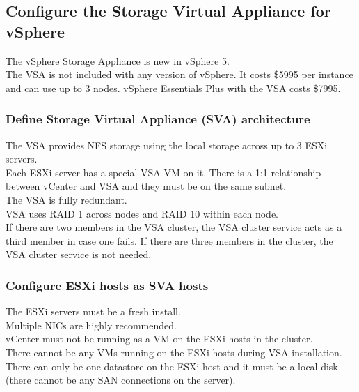 \subsection{Configure the Storage Virtual Appliance for vSphere}

The vSphere Storage Appliance is new in vSphere 5.\\

The VSA is not included with any version of vSphere. It costs \$5995 per
instance and can use up to 3 nodes. vSphere Essentials Plus with the VSA
costs \$7995.

\subsubsection{Define Storage Virtual Appliance (SVA) architecture}

The VSA provides NFS storage using the local storage across up to 3 ESXi
servers.\\

Each ESXi server has a special VSA VM on it. There is a 1:1 relationship
between vCenter and VSA and they must be on the same subnet.\\

The VSA is fully redundant.\\

VSA uses RAID 1 across nodes and RAID 10 within each node.\\

If there are two members in the VSA cluster, the VSA cluster service acts
as a third member in case one fails. If there are three members in the cluster,
the VSA cluster service is not needed.

\subsubsection{Configure ESXi hosts as SVA hosts}

The ESXi servers must be a fresh install.\\

Multiple NICs are highly recommended.\\

vCenter must not be running as a VM on the ESXi hosts in the cluster.\\

There cannot be any VMs running on the ESXi hosts during VSA installation.\\

There can only be one datastore on the ESXi host and it must be a local disk
(there cannot be any SAN connections on the server).\\

